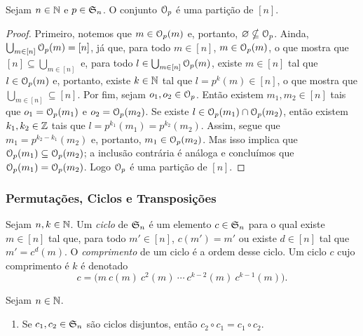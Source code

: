 \begin{prop}
	Sejam $n \in \mathbb{N}$ e $p \in \mathfrak{S}_n$. O conjunto $\mathcal{O}_p$ é uma partição de $[n]$.
\end{prop}
\begin{proof}
	Primeiro, notemos que $m \in \mathcal{O}_p(m)$ e, portanto, $\varnothing \nsubseteq \mathcal{O}_p$. Ainda, $\bigcup_{m \in [n]} \mathcal{O}_p(m) = [n]$, já que, para todo $m \in [n]$, $m \in \mathcal{O}_p(m)$, o que mostra que $[n] \subseteq \bigcup_{m \in [n]}$ e, para todo $l \in \bigcup_{m \in [n]} \mathcal{O}_p(m)$, existe $m \in [n]$ tal que $l \in \mathcal{O}_p(m)$ e, portanto, existe $k \in \mathbb{N}$ tal que $l=p^k(m) \in [n]$, o que mostra que $\bigcup_{m \in [n]} \subseteq [n]$. Por fim, sejam $o_1,o_2 \in \mathcal{O}_p$. Então existem $m_1,m_2 \in [n]$ tais que $o_1=\mathcal{O}_p(m_1)$ e $o_2=\mathcal{O}_p(m_2)$. Se existe $l \in \mathcal{O}_p(m_1) \cap \mathcal{O}_p(m_2)$, então existem $k_1,k_2 \in \mathbb{Z}$ tais que $l=p^{k_1}(m_1)=p^{k_2}(m_2)$. Assim, segue que $m_1=p^{k_2-k_1}(m_2)$ e, portanto, $m_1 \in \mathcal{O}_p(m_2)$. Mas isso implica que $\mathcal{O}_p(m_1) \subseteq \mathcal{O}_p(m_2)$; a inclusão contrária é análoga e concluímos que $\mathcal{O}_p(m_1) = \mathcal{O}_p(m_2)$. Logo $\mathcal{O}_p$ é uma partição de $[n]$.
\end{proof}

\subsubsection{Permutações, Ciclos e Transposições}

\begin{defi}
	Sejam $n,k \in \mathbb{N}$. Um \emph{ciclo} de $\mathfrak{S}_n$ é um elemento $c \in \mathfrak{S}_n$ para o qual existe $m \in [n]$ tal que, para todo $m' \in [n]$, $c(m')=m'$ ou existe $d \in [n]$ tal que $m'=c^d(m)$. O \emph{comprimento} de um ciclo é a ordem desse ciclo. Um ciclo $c$ cujo comprimento é $k$ é denotado
	\begin{equation*}
	c = \bigl(m \ c(m) \ c^2(m) \ \cdots \  c^{k-2}(m) \ c^{k-1}(m)\bigr).
	\end{equation*}
\end{defi}


\begin{prop}
	Sejam $n \in \mathbb{N}$.
	\begin{enumerate}
	\item Se $c_1,c_2 \in \mathfrak{S}_n$ são ciclos disjuntos, então $c_2 \circ c_1 = c_1 \circ c_2$.
	\end{enumerate}
\end{prop}

